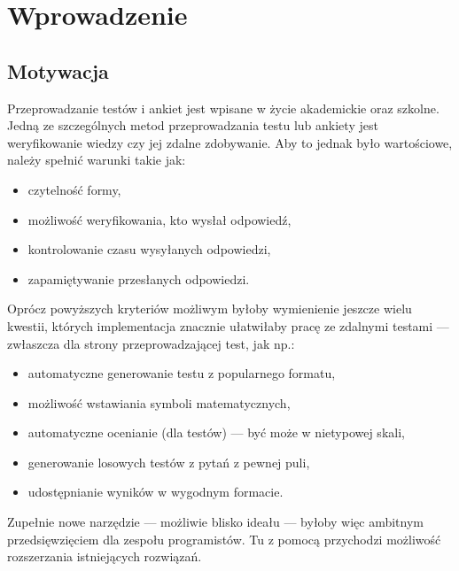 \chapter{Wprowadzenie}%
\section{Motywacja}
Przeprowadzanie testów i ankiet jest wpisane w życie akademickie oraz szkolne. Jedną ze szczególnych metod przeprowadzania testu lub ankiety jest weryfikowanie wiedzy czy jej zdalne zdobywanie.
Aby to jednak było wartościowe, należy spełnić warunki takie jak:
\begin{itemize}
\item czytelność formy,
\item możliwość weryfikowania, kto wysłał odpowiedź,
\item kontrolowanie czasu wysyłanych odpowiedzi,
\item zapamiętywanie przesłanych odpowiedzi.
\end{itemize}
Oprócz powyższych kryteriów możliwym byłoby wymienienie jeszcze wielu kwestii, których implementacja znacznie ułatwiłaby pracę ze zdalnymi testami --- zwłaszcza dla strony przeprowadzającej test, jak np.:
\begin{itemize}
\item automatyczne generowanie testu z popularnego formatu,
\item możliwość wstawiania symboli matematycznych,
\item automatyczne ocenianie (dla testów)  --- być może w nietypowej skali,
\item generowanie losowych testów z pytań z pewnej puli,
\item udostępnianie wyników w wygodnym formacie.
\end{itemize}
Zupełnie nowe narzędzie --- możliwie blisko ideału --- byłoby więc ambitnym przedsięwzięciem dla zespołu programistów. Tu z pomocą przychodzi możliwość rozszerzania istniejących rozwiązań.

